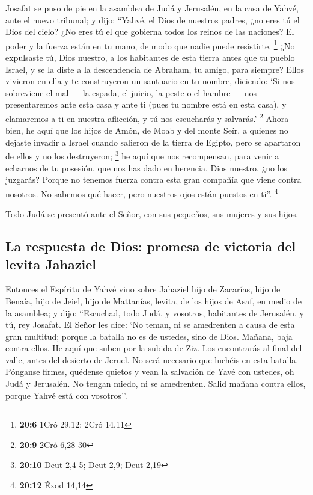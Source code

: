 \begin{paracol}{2}
 Josafat se puso de pie en la asamblea de Judá y
Jerusalén, en la casa de Yahvé, ante el nuevo tribunal;  y
dijo: ``Yahvé, el Dios de nuestros padres, ¿no eres tú el Dios del
cielo? ¿No eres tú el que gobierna todos los reinos de las naciones? El
poder y la fuerza están en tu mano, de modo que nadie puede resistirte.
\footnote{\textbf{20:6} 1Cró 29,12; 2Cró 14,11}  ¿No
expulsaste tú, Dios nuestro, a los habitantes de esta tierra antes que
tu pueblo Israel, y se la diste a la descendencia de Abraham, tu amigo,
para siempre?  Ellos vivieron en ella y te construyeron un
santuario en tu nombre, diciendo:  `Si nos sobreviene el
mal --- la espada, el juicio, la peste o el hambre --- nos presentaremos
ante esta casa y ante ti (pues tu nombre está en esta casa), y
clamaremos a ti en nuestra aflicción, y tú nos escucharás y salvarás.'
\footnote{\textbf{20:9} 2Cró 6,28-30}  Ahora bien, he
aquí que los hijos de Amón, de Moab y del monte Seír, a quienes no
dejaste invadir a Israel cuando salieron de la tierra de Egipto, pero se
apartaron de ellos y no los destruyeron; \footnote{\textbf{20:10} Deut
  2,4-5; Deut 2,9; Deut 2,19}  he aquí que nos
recompensan, para venir a echarnos de tu posesión, que nos has dado en
herencia.  Dios nuestro, ¿no los juzgarás? Porque no
tenemos fuerza contra esta gran compañía que viene contra nosotros. No
sabemos qué hacer, pero nuestros ojos están puestos en ti''. \footnote{\textbf{20:12}
  Éxod 14,14}

 Todo Judá se presentó ante el Señor, con sus pequeños,
sus mujeres y sus hijos.

\hypertarget{la-respuesta-de-dios-promesa-de-victoria-del-levita-jahaziel}{%
\subsection{La respuesta de Dios: promesa de victoria del levita
Jahaziel}\label{la-respuesta-de-dios-promesa-de-victoria-del-levita-jahaziel}}

 Entonces el Espíritu de Yahvé vino sobre Jahaziel hijo
de Zacarías, hijo de Benaía, hijo de Jeiel, hijo de Mattanías, levita,
de los hijos de Asaf, en medio de la asamblea;  y dijo:
``Escuchad, todo Judá, y vosotros, habitantes de Jerusalén, y tú, rey
Josafat. El Señor les dice: `No teman, ni se amedrenten a causa de esta
gran multitud; porque la batalla no es de ustedes, sino de Dios.
 Mañana, baja contra ellos. He aquí que suben por la
subida de Ziz. Los encontrarás al final del valle, antes del desierto de
Jeruel.  No será necesario que luchéis en esta batalla.
Pónganse firmes, quédense quietos y vean la salvación de Yavé con
ustedes, oh Judá y Jerusalén. No tengan miedo, ni se amedrenten. Salid
mañana contra ellos, porque Yahvé está con vosotros''.


\end{paracol}
